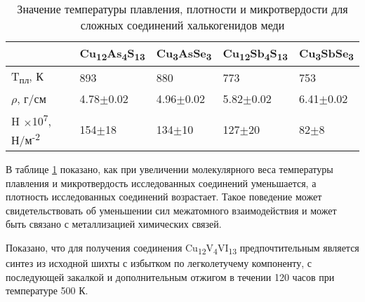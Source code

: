 \begin{table} [htbp]%
    \centering
	\caption{Значение температуры плавления, плотности и микротвердости для сложных соединений халькогенидов меди}%
	\label{hard}%
    \renewcommand{\arraystretch}{1.5}
	\begin{tabular}{@{}@{\extracolsep{20pt}}lllll@{}} 
        \toprule     %
    	 & Cu\textsubscript{12}As\textsubscript{4}S\textsubscript{13} &Cu\textsubscript{3}AsSe\textsubscript{3}& Cu\textsubscript{12}Sb\textsubscript{4}S\textsubscript{13} &Cu\textsubscript{3}SbSe\textsubscript{3}	\\
        \midrule  
    T\textsubscript{пл}, К & 893 & 880												& 773& 753	\\ \hline
    	$ \rho$, г/см 	&  4.78$\pm$0.02	 						& 4.96$\pm$0.02												&5.82$\pm$0.02 	& 6.41$\pm$0.02 \\ \hline
    	H $\times$10\textsuperscript{7}, Н/м\textsuperscript{-2} 	& 154$\pm$18	 						& 134$\pm$10 	& 127$\pm$20			& 82$\pm$8	\\ \hline

        \bottomrule 
	\end{tabular}%
\end{table}
В таблице \ref{hard} показано, как при увеличении молекулярного веса температуры плавления и микротвердость исследованных соединений уменьшается, а плотность исследованных соединений возрастает. Такое поведение может свидетельствовать об уменьшении сил межатомного взаимодействия и может быть связано с металлизацией химических
связей.

Показано, что для получения соединения Cu\textsubscript{12}V\textsubscript{4}VI\textsubscript{13} предпочтительным является синтез из
исходной шихты с избытком по легколетучему компоненту, с последующей закалкой и
дополнительным отжигом в течении 120 часов при температуре 500 К.
\clearpage

\newpage